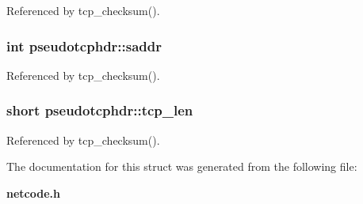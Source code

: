 Referenced by tcp\_\-checksum().
\subsubsection[{saddr}]{\setlength{\rightskip}{0pt plus 5cm}int {\bf pseudotcphdr::saddr}}\label{structpseudotcphdr_f66b91a716a9c905d8d2bed85d23139b}




Referenced by tcp\_\-checksum().
\subsubsection[{tcp\_\-len}]{\setlength{\rightskip}{0pt plus 5cm}short {\bf pseudotcphdr::tcp\_\-len}}\label{structpseudotcphdr_2f09170f07de0f72f4a9dddb901575e1}




Referenced by tcp\_\-checksum().

The documentation for this struct was generated from the following file:\begin{CompactItemize}
\item 
{\bf netcode.h}\end{CompactItemize}
